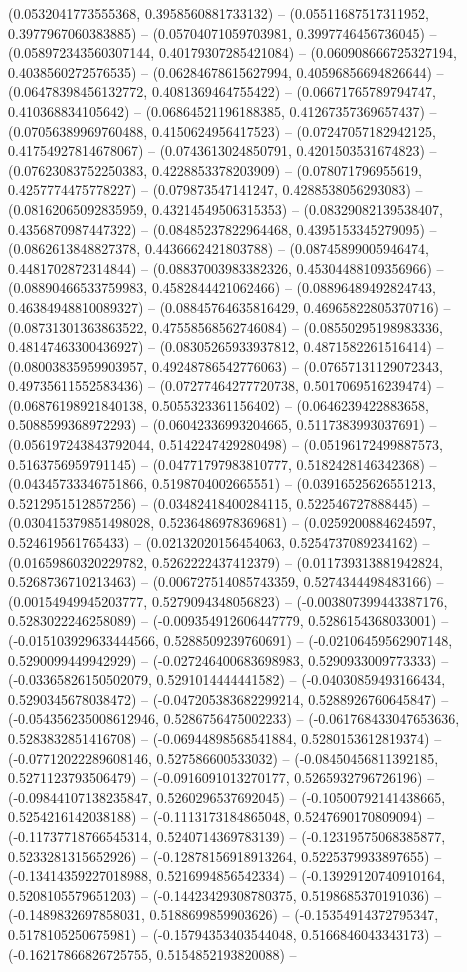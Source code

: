 (0.0532041773555368, 0.3958560881733132) -- (0.05511687517311952, 0.3977967060383885) -- (0.05704071059703981, 0.3997746456736045) -- (0.058972343560307144, 0.40179307285421084) -- (0.060908666725327194, 0.4038560272576535) -- (0.06284678615627994, 0.40596856694826644) -- (0.06478398456132772, 0.4081369464755422) -- (0.06671765789794747, 0.410368834105642) -- (0.06864521196188385, 0.41267357369657437) -- (0.07056389969760488, 0.4150624956417523) -- (0.07247057182942125, 0.41754927814678067) -- (0.0743613024850791, 0.4201503531674823) -- (0.07623083752250383, 0.4228853378203909) -- (0.078071796955619, 0.4257774475778227) -- (0.079873547141247, 0.4288538056293083) -- (0.08162065092835959, 0.43214549506315353) -- (0.08329082139538407, 0.4356870987447322) -- (0.08485237822964468, 0.4395153345279095) -- (0.0862613848827378, 0.4436662421803788) -- (0.08745899005946474, 0.4481702872314844) -- (0.08837003983382326, 0.45304488109356966) -- (0.08890466533759983, 0.4582844421062466) -- (0.08896489492824743, 0.46384948810089327) -- (0.08845764635816429, 0.46965822805370716) -- (0.08731301363863522, 0.47558568562746084) -- (0.08550295198983336, 0.48147463300436927) -- (0.08305265933937812, 0.4871582261516414) -- (0.08003835959903957, 0.49248786542776063) -- (0.07657131129072343, 0.49735611552583436) -- (0.07277464277720738, 0.5017069516239474) -- (0.06876198921840138, 0.5055323361156402) -- (0.0646239422883658, 0.5088599368972293) -- (0.06042336993204665, 0.5117383993037691) -- (0.056197243843792044, 0.5142247429280498) -- (0.05196172499887573, 0.5163756959791145) -- (0.04771797983810777, 0.5182428146342368) -- (0.04345733346751866, 0.5198704002665551) -- (0.03916525626551213, 0.5212951512857256) -- (0.03482418400284115, 0.522546727888445) -- (0.030415379851498028, 0.5236486978369681) -- (0.0259200884624597, 0.524619561765433) -- (0.02132020156454063, 0.5254737089234162) -- (0.01659860320229782, 0.5262222437412379) -- (0.011739313881942824, 0.5268736710213463) -- (0.006727514085743359, 0.5274344498483166) -- (0.00154949945203777, 0.5279094348056823) -- (-0.003807399443387176, 0.5283022246258089) -- (-0.009354912606447779, 0.5286154368033001) -- (-0.015103929633444566, 0.5288509239760691) -- (-0.02106459562907148, 0.5290099449942929) -- (-0.027246400683698983, 0.5290933009773333) -- (-0.03365826150502079, 0.5291014444441582) -- (-0.04030859493166434, 0.5290345678038472) -- (-0.047205383682299214, 0.5288926760645847) -- (-0.054356235008612946, 0.5286756475002233) -- (-0.061768433047653636, 0.5283832851416708) -- (-0.06944898568541884, 0.5280153612819374) -- (-0.07712022289608146, 0.527586600533032) -- (-0.08450456811392185, 0.5271123793506479) -- (-0.0916091013270177, 0.5265932796726196) -- (-0.09844107138235847, 0.5260296537692045) -- (-0.10500792141438665, 0.5254216142038188) -- (-0.1113173184865048, 0.5247690170809094) -- (-0.11737718766545314, 0.5240714369783139) -- (-0.12319575068385877, 0.5233281315652926) -- (-0.12878156918913264, 0.5225379933897655) -- (-0.13414359227018988, 0.5216994856542334) -- (-0.13929120740910164, 0.5208105579651203) -- (-0.14423429308780375, 0.5198685370191036) -- (-0.1489832697858031, 0.5188699859903626) -- (-0.15354914372795347, 0.5178105250675981) -- (-0.15794353403544048, 0.5166846043343173) -- (-0.16217866826725755, 0.5154852193820088) -- 